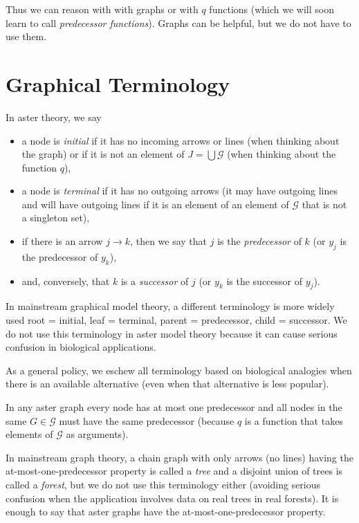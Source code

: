 Thus we can reason with with graphs or with $q$ functions (which we will
soon learn to call \emph{predecessor functions}).
Graphs can be helpful, but we do not have to use them.

\section{Graphical Terminology}
\label{sec:graphical-terminology}

In aster theory, we say
\begin{itemize}
\item a node is \emph{initial} if it has no incoming arrows
    or lines (when thinking about the graph) or if it is not an element
    of $J = \bigcup \mathcal{G}$ (when thinking about the function $q$),
\item a node is \emph{terminal} if it has no outgoing arrows
    (it may have outgoing lines and will have outgoing lines if it is
    an element of an element of $\mathcal{G}$ that is not a singleton set),
\item if there is an arrow $j \longrightarrow k$, then we say that $j$
    is the \emph{predecessor} of $k$ (or $y_j$ is the predecessor of $y_k$),
\item and, conversely, that $k$ is a \emph{successor} of $j$
    (or $y_k$ is the successor of $y_j$).
\end{itemize}

In mainstream graphical model theory, a different terminology is more widely
used \citep{lauritzen} root = initial, leaf = terminal, parent = predecessor,
child = successor.  We do not use this terminology in aster model theory
because it can cause serious confusion in biological applications.

As a general policy, we eschew all terminology based on biological analogies
when there is an available alternative (even when that alternative is less
popular).

In any aster graph every node has at most one predecessor and all nodes in
the same $G \in \mathcal{G}$ must have the same predecessor (because $q$
is a function that takes elements of $\mathcal{G}$ as arguments).

In mainstream graph theory, a chain graph with only arrows (no lines) having
the at-most-one-predecessor property is called a \emph{tree} and a disjoint
union of trees is called a \emph{forest}, but we do not use this terminology
either (avoiding serious confusion when the application involves data on
real trees in real forests).  It is enough to say that aster graphs
have the at-most-one-predecessor property.

